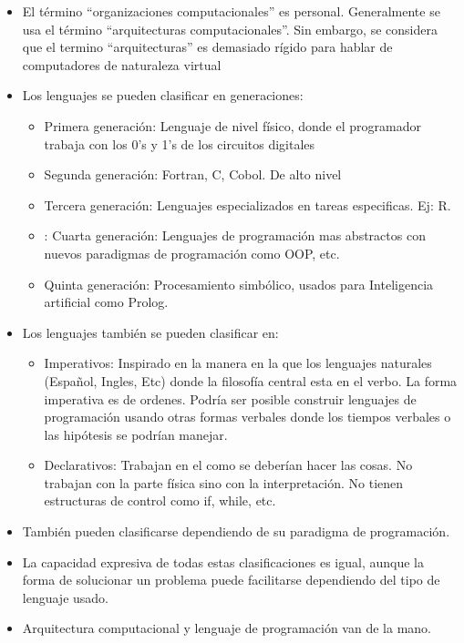 \begin{itemize}
    \item El término ``organizaciones computacionales'' es personal. Generalmente se usa el término ``arquitecturas computacionales''. Sin embargo, se considera que el termino ``arquitecturas'' es demasiado rígido para hablar de computadores de naturaleza virtual
    \item Los lenguajes se pueden clasificar en generaciones:
    \begin{itemize}
        \item Primera generación: Lenguaje de nivel físico, donde el programador trabaja con los 0's y 1's de los circuitos digitales
        \item Segunda generación: Fortran, C, Cobol. De alto nivel
        \item Tercera generación: Lenguajes especializados en tareas especificas. Ej: R.
        \item: Cuarta generación: Lenguajes de programación mas abstractos con nuevos paradigmas de programación como OOP, etc.
        \item Quinta generación: Procesamiento simbólico, usados para Inteligencia artificial como Prolog.
    \end{itemize}
    
    \item Los lenguajes también se pueden clasificar en:
    \begin{itemize}
        \item Imperativos: Inspirado en la manera en la que los lenguajes naturales (Español, Ingles, Etc) donde la filosofía central esta en el verbo. La forma imperativa es de ordenes. Podría ser posible construir lenguajes de programación usando otras formas verbales donde los tiempos verbales o las hipótesis se podrían manejar.
        \item Declarativos: Trabajan en el como se deberían hacer las cosas. No trabajan con la parte física sino con la interpretación. No tienen estructuras de control como if, while, etc.
    \end{itemize}
    \item También pueden clasificarse dependiendo de su paradigma de programación.
    \item La capacidad expresiva de todas estas clasificaciones es igual, aunque la forma de solucionar un problema puede facilitarse dependiendo del tipo de lenguaje usado.
    \item Arquitectura computacional y lenguaje de programación van de la mano.
    

\end{itemize}
